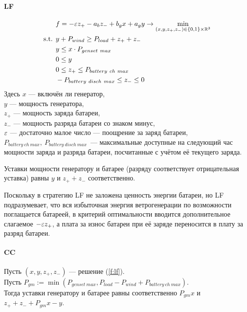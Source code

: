 \paragraph{LF}
\label{par:lf}
\begin{equation}\label{f:lf}
\begin{split}
\vspace{-4mm}
&f = -\eps z_+ - a_b z_- 
+ b_g x + a_g y
\rightarrow \min\limits_{(x, y, z_+, z_-) \in \{0,1\} \times \R^3 }\\
\text{s.t. }& y + P_{wind} \geq P_{load} + z_+ + z_-\\
&y \leq x \cdot P_{genset~max}\\
&0 \leq y \\
&0 \leq z_+ \leq P_{battery~ch~max} \\
&-P_{battery~disch~max} \leq z_- \leq 0 \\
\end{split}
\end{equation}
Здесь $x$ --- включён ли генератор,\\
$y$ --- мощность генератора,\\
$z_+$ --- мощность заряда батареи,\\
$z_-$ --- мощность разряда батареи со знаком минус,\\
$\varepsilon$ --- достаточно малое число --- поощрение за заряд батареи,\\
$P_{battery~ch~max},~P_{battery~disch~max}$~--- максимальные доступные на следующий час мощности заряда и разряда батареи, посчитанные с учётом её текущего заряда.

Уставки мощности генератору и батарее (разряду соответствует отрицательная уставка) равны $y$ и $z_+ + z_-$ соответственно.

Поскольку в стратегию LF не заложена ценность энергии батареи, но LF подразумевает, что вся избыточная энергия ветрогенерации по возможности поглащается батареей, в критерий оптимальности вводится дополнительное слагаемое $-\varepsilon z_+$, а плата за износ батареи при её заряде переносится в плату за разряд батареи.


\paragraph{CC}
Пусть $(x, y, z_+, z_-)$ --- решение (\ref{f:lf}).\\
Пусть $P_{gm} := \min(P_{genset~max}, P_{load}- P_{wind} + P_{battery~ch~max})$.\\
Тогда уставки генератору и батарее равны соответственно $P_{gm}x$ и $z_+ + z_- + P_{gm}x - y$.

